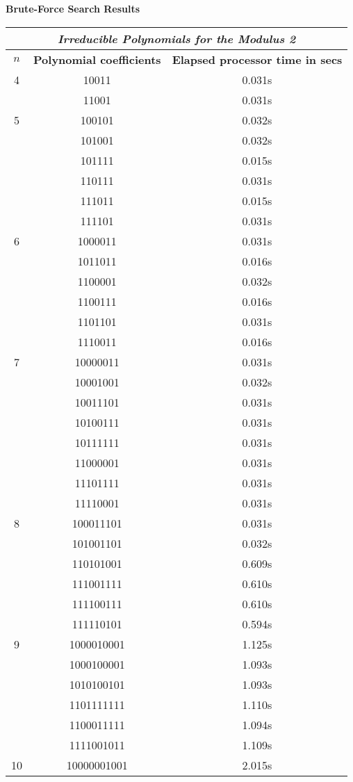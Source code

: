 \documentclass[iwp,first]{luthesis}
\begin{document}
\textbf{Brute-Force Search Results}
\\
\begin{center}
\begin{tabular}{|c|c|c|}
\hline
\multicolumn{3}{|c|}{\textit{Irreducible Polynomials for the Modulus 2}} \\
\hline
\textbf{$n$} & \textbf{Polynomial coefficients} & \textbf{Elapsed processor time in secs} \\ \hline
4 & 10011 & 0.031s  \\ 
 & 11001 & 0.031s \\ \hline
5 & 100101 & 0.032s \\ 
 & 101001 & 0.032s \\
 & 101111 & 0.015s \\
 & 110111 & 0.031s \\
 & 111011 & 0.015s \\
 & 111101 & 0.031s \\ \hline
6 & 1000011 & 0.031s \\
 & 1011011 & 0.016s\\
 & 1100001 & 0.032s \\
 & 1100111 & 0.016s \\
 & 1101101 & 0.031s \\
 & 1110011 & 0.016s \\ \hline
7 & 10000011 & 0.031s \\
 & 10001001 & 0.032s \\
 & 10011101 & 0.031s \\
 & 10100111 & 0.031s \\
 & 10111111 & 0.031s \\
 & 11000001 & 0.031s \\
 & 11101111 & 0.031s \\
 & 11110001 & 0.031s \\ \hline
8 & 100011101 & 0.031s \\
 & 101001101 & 0.032s \\
 & 110101001 & 0.609s \\
 & 111001111 & 0.610s \\
 & 111100111 & 0.610s \\
 & 111110101 & 0.594s \\ \hline
9 & 1000010001 & 1.125s \\
 & 1000100001 & 1.093s \\
 & 1010100101 & 1.093s \\
 & 1101111111 & 1.110s \\
 & 1100011111 & 1.094s \\
 & 1111001011 & 1.109s \\ \hline
10 & 10000001001 & 2.015s\\
\hline
\end{tabular}
\end{center}
\end{document}
